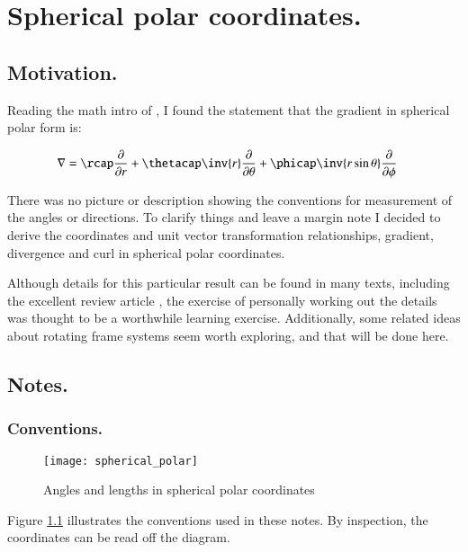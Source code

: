 \chapter{Spherical polar coordinates.}
\date{ Nov 13, 2008.  $RCSfile: sphericalPolar.tex,v $ Last $Revision: 1.18 $ $Date: 2009/06/11 16:45:58 $ }

\section{Motivation. }

Reading the math intro of \cite{zeilik1998iaa}, I found the statement that the gradient in spherical polar form is:

\begin{align*}
\grad &= 
\rcap \PD{r}{}
+\thetacap \inv{r} \PD{\theta}{}
+\phicap \inv{r \sin\theta}\PD{\phi}{}
\end{align*}

There was no picture or description showing the conventions for measurement of the angles or directions.
To clarify things and leave a margin note I decided to derive the coordinates and unit vector transformation relationships,
gradient, divergence and curl in spherical polar coordinates.

Although details for this particular result can be found in many texts,
including the excellent review article \cite{fleischCoords}, the 
exercise of personally working out the details was thought to be
a worthwhile
learning exercise.  Additionally, some related ideas about rotating
frame systems seem worth exploring, and that will be done here.

\section{Notes. }
\subsection{Conventions. }

\begin{figure}[htp]
\centering
\texttt{[image: spherical\_polar]}
\caption{Angles and lengths in spherical polar coordinates}\label{fig:spherical_polar}
\end{figure}

Figure \ref{fig:spherical_polar} illustrates the conventions used in 
these notes.  By inspection, the coordinates can be read off the diagram.

